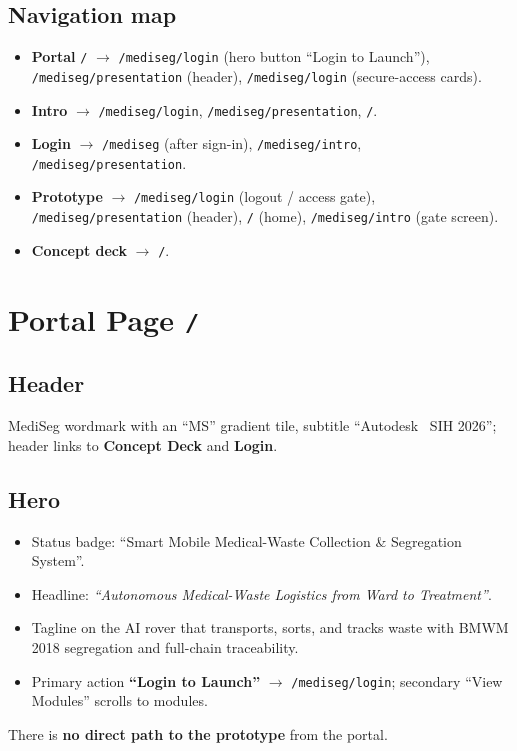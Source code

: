 \documentclass[11pt, a4paper]{article}
\begin{document}
\subsection{Navigation map}
\begin{itemize}[leftmargin=1.6em, itemsep=2pt]
  \item \textbf{Portal} \texttt{/} $\rightarrow$ \texttt{/mediseg/login} (hero
        button ``Login to Launch''), \texttt{/mediseg/presentation} (header),
        \texttt{/mediseg/login} (secure-access cards).
  \item \textbf{Intro} $\rightarrow$ \texttt{/mediseg/login}, \texttt{/mediseg/presentation},
        \texttt{/}.
  \item \textbf{Login} $\rightarrow$ \texttt{/mediseg} (after sign-in),
        \texttt{/mediseg/intro}, \texttt{/mediseg/presentation}.
  \item \textbf{Prototype} $\rightarrow$ \texttt{/mediseg/login} (logout /
        access gate), \texttt{/mediseg/presentation} (header),
        \texttt{/} (home), \texttt{/mediseg/intro} (gate screen).
  \item \textbf{Concept deck} $\rightarrow$ \texttt{/}.
\end{itemize}

\section{Portal Page \texttt{/}}

\subsection{Header}
MediSeg wordmark with an ``MS'' gradient tile, subtitle
``Autodesk \textperiodcentered\ SIH 2026''; header links to
\textbf{Concept Deck} and \textbf{Login}.

\subsection{Hero}
\begin{itemize}[leftmargin=1.6em, itemsep=2pt]
  \item Status badge: ``Smart Mobile Medical-Waste Collection \& Segregation System''.
  \item Headline: \emph{``Autonomous Medical-Waste Logistics from Ward to
        Treatment''}.
  \item Tagline on the AI rover that transports, sorts, and tracks waste with
        BMWM 2018 segregation and full-chain traceability.
  \item Primary action \textbf{``Login to Launch''} $\rightarrow$
        \texttt{/mediseg/login}; secondary ``View Modules'' scrolls to modules.
\end{itemize}
There is \textbf{no direct path to the prototype} from the portal.
\end{document}
